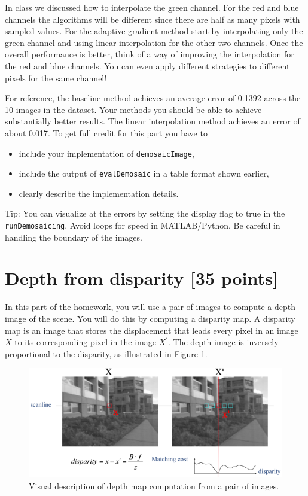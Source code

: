 \documentclass[10pt,letterpaper]{article}
\newcommand{\cmd}[1] {{\color{blue}\texttt{#1}}}
\begin{document}
In class we discussed how to interpolate the green channel. For the red and blue channels the algorithms will be different since there are half as many pixels with sampled values. For the adaptive gradient method start by interpolating only the green channel and using linear interpolation for the other two channels. Once the overall performance is better, think of a way of improving the interpolation for the red and blue channels. You can even apply different strategies to different pixels for the same channel! 

For reference, the baseline method achieves an average error of 0.1392 across the 10 images in the dataset. Your methods you should be able to achieve substantially better results. The linear interpolation method achieves an error of about 0.017. To get full credit for this part you have to 
\begin{itemize}
\item include your implementation of \cmd{demosaicImage}, 
\item include the output of \cmd{evalDemosaic} in a table format shown earlier,
\item clearly describe the implementation details.
\end{itemize}

Tip: You can visualize at the errors by setting the display flag to true in the \cmd{runDemosaicing}. Avoid loops for speed in MATLAB/Python. Be careful in handling the boundary of the images.

\section{Depth from disparity [35 points]}

In this part of the homework, you will use a pair of images to compute a depth image of the scene.
You will do this by computing a disparity map.
A disparity map is an image that stores the displacement that leads every pixel in an image $X$ to its
corresponding pixel in the image $X^\prime$.
The depth image is inversely proportional to the disparity, as illustrated in Figure \ref{fig:disparity}.

\begin{figure}[h]
\centering
\includegraphics[width=0.7\linewidth]{fig/disparity.png}
\caption{\label{fig:disparity} Visual description of depth map computation from a pair of images.}
\end{figure}
\end{document}
